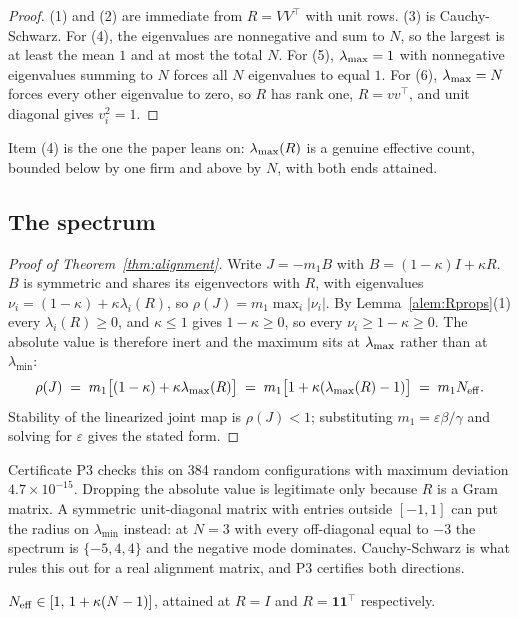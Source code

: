 \begin{proof}
(1) and (2) are immediate from $R=VV^{\top}$ with unit rows. (3) is Cauchy-Schwarz. For (4), the eigenvalues are nonnegative and sum to $N$, so the largest is at least the mean $1$ and at most the total $N$. For (5), $\lambda_{\max}=1$ with nonnegative eigenvalues summing to $N$ forces all $N$ eigenvalues to equal $1$. For (6), $\lambda_{\max}=N$ forces every other eigenvalue to zero, so $R$ has rank one, $R=vv^{\top}$, and unit diagonal gives $v_i^2=1$.
\end{proof}

Item (4) is the one the paper leans on: $\lambda_{\max}(R)$ is a genuine effective count, bounded below by one firm and above by $N$, with both ends attained.

\subsection{The spectrum}

\begin{proof}[Proof of Theorem~\ref{thm:alignment}]
Write $J = -m_1 B$ with $B = (1-\kappa)I + \kappa R$. $B$ is symmetric and shares its eigenvectors with $R$, with eigenvalues $\nu_i = (1-\kappa) + \kappa\lambda_i(R)$, so $\rho(J) = m_1 \max_i |\nu_i|$. By Lemma~\ref{alem:Rprops}(1) every $\lambda_i(R)\geq 0$, and $\kappa \leq 1$ gives $1-\kappa\geq 0$, so every $\nu_i \geq 1-\kappa \geq 0$. The absolute value is therefore inert and the maximum sits at $\lambda_{\max}$ rather than at $\lambda_{\min}$:
\[
  \rho(J) \;=\; m_1\big[(1-\kappa) + \kappa\lambda_{\max}(R)\big] \;=\; m_1\big[1 + \kappa(\lambda_{\max}(R)-1)\big] \;=\; m_1 N_{\mathrm{eff}}.
\]
Stability of the linearized joint map is $\rho(J)<1$; substituting $m_1 = \varepsilon\beta/\gamma$ and solving for $\varepsilon$ gives the stated form.
\end{proof}

Certificate P3 checks this on 384 random configurations with maximum deviation $4.7\times 10^{-15}$. Dropping the absolute value is legitimate only because $R$ is a Gram matrix. A symmetric unit-diagonal matrix with entries outside $[-1,1]$ can put the radius on $\lambda_{\min}$ instead: at $N=3$ with every off-diagonal equal to $-3$ the spectrum is $\{-5,4,4\}$ and the negative mode dominates. Cauchy-Schwarz is what rules this out for a real alignment matrix, and P3 certifies both directions.

\begin{acorollary}
\label{acor:range}
$N_{\mathrm{eff}} \in [1,\, 1+\kappa(N-1)]$, attained at $R=I$ and $R=\mathbf{1}\mathbf{1}^{\top}$ respectively.
\end{acorollary}

